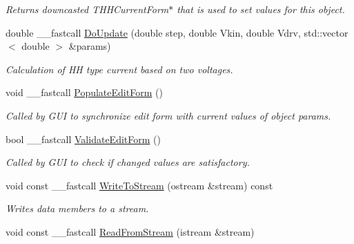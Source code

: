 \begin{DoxyCompactItemize}
\begin{DoxyCompactList}\small\item\em Returns downcasted T\+H\+H\+Current\+Form$\ast$ that is used to set values for this object. \end{DoxyCompactList}\item 
double \+\_\+\+\_\+fastcall \hyperlink{class_t_h_h_linear_piecewise_current_a7607b43e63ba9761d083aba7c25edfd6}{Do\+Update} (double step, double Vkin, double Vdrv, std\+::vector$<$ double $>$ \&params)
\begin{DoxyCompactList}\small\item\em Calculation of H\+H type current based on two voltages. \end{DoxyCompactList}\item 
\hypertarget{class_t_h_h_linear_piecewise_current_a38f06e164c879be3217bf28e0d4007eb}{void \+\_\+\+\_\+fastcall \hyperlink{class_t_h_h_linear_piecewise_current_a38f06e164c879be3217bf28e0d4007eb}{Populate\+Edit\+Form} ()}\label{class_t_h_h_linear_piecewise_current_a38f06e164c879be3217bf28e0d4007eb}

\begin{DoxyCompactList}\small\item\em Called by G\+U\+I to synchronize edit form with current values of object params. \end{DoxyCompactList}\item 
\hypertarget{class_t_h_h_linear_piecewise_current_ac3a70f25cf651fbd5325b3a58274ea6b}{bool \+\_\+\+\_\+fastcall \hyperlink{class_t_h_h_linear_piecewise_current_ac3a70f25cf651fbd5325b3a58274ea6b}{Validate\+Edit\+Form} ()}\label{class_t_h_h_linear_piecewise_current_ac3a70f25cf651fbd5325b3a58274ea6b}

\begin{DoxyCompactList}\small\item\em Called by G\+U\+I to check if changed values are satisfactory. \end{DoxyCompactList}\item 
\hypertarget{class_t_h_h_linear_piecewise_current_a31c5f0dc47ca42c6980fda9805a91bbf}{void const \+\_\+\+\_\+fastcall \hyperlink{class_t_h_h_linear_piecewise_current_a31c5f0dc47ca42c6980fda9805a91bbf}{Write\+To\+Stream} (ostream \&stream) const }\label{class_t_h_h_linear_piecewise_current_a31c5f0dc47ca42c6980fda9805a91bbf}

\begin{DoxyCompactList}\small\item\em Writes data members to a stream. \end{DoxyCompactList}\item 
\hypertarget{class_t_h_h_linear_piecewise_current_ab1b1960c579db90343e0fe262ec54554}{void const \+\_\+\+\_\+fastcall \hyperlink{class_t_h_h_linear_piecewise_current_ab1b1960c579db90343e0fe262ec54554}{Read\+From\+Stream} (istream \&stream)}\label{class_t_h_h_linear_piecewise_current_ab1b1960c579db90343e0fe262ec54554}


\end{DoxyCompactItemize}
